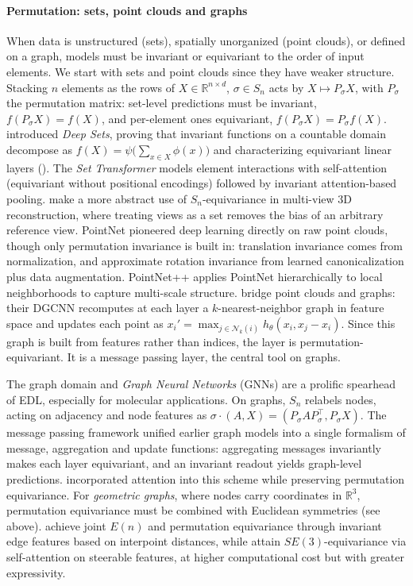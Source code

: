 \documentclass[mathematics,review,submit,moreauthors]{Definitions/mdpi}
\begin{document}
\paragraph{Permutation: sets, point clouds and graphs}\label{sec:edl-permutation}
When data is unstructured (sets), spatially unorganized (point clouds), or defined on a graph, models must be invariant or equivariant to the order of input elements.
We start with sets and point clouds since they have weaker structure.
Stacking $n$ elements as the rows of $X\in\mathbb{R}^{n\times d}$, $\sigma\in S_n$ acts by $X\mapsto P_\sigma X$, with $P_\sigma$ the permutation matrix: set-level predictions must be invariant, $f(P_\sigma X)=f(X)$, and per-element ones equivariant, $f(P_\sigma X)=P_\sigma f(X)$.
\citet{zaheer2018} introduced \emph{Deep Sets}, proving that invariant functions on a countable domain decompose as $f(X)=\psi\big(\sum_{x\in X}\phi(x)\big)$ and characterizing equivariant linear layers ().
The \emph{Set Transformer} \citep{lee2019p3icml} models element interactions with self-attention (equivariant without positional encodings) followed by invariant attention-based pooling.
\citet{wang2025} make a more abstract use of $S_n$-equivariance in multi-view 3D reconstruction, where treating views as a set removes the bias of an arbitrary reference view.
PointNet \citep{qi2017a} pioneered deep learning directly on raw point clouds, though only permutation invariance is built in: translation invariance comes from normalization, and approximate rotation invariance from learned canonicalization plus data augmentation. 
PointNet++ \citep{qi2017} applies PointNet hierarchically to local neighborhoods to capture multi-scale structure.
\citet{wang2019} bridge point clouds and graphs: their DGCNN recomputes at each layer a $k$-nearest-neighbor graph in feature space and updates each point as $x_i'=\max_{j\in\mathcal{N}_k(i)}h_\theta(x_i,x_j-x_i)$.
Since this graph is built from features rather than indices, the layer is permutation-equivariant.
It is a message passing layer, the central tool on graphs.

The graph domain and \emph{Graph Neural Networks} (GNNs) are a prolific spearhead of EDL, especially for molecular applications.
On graphs, $S_n$ relabels nodes, acting on adjacency and node features as $\sigma\cdot(A,X)=(P_\sigma AP_\sigma^\top,P_\sigma X)$.
The message passing framework \citep{gilmer2017} unified earlier graph models \citep{duvenaud2015,kipf2017,bruna2014} into a single formalism of message, aggregation and update functions: aggregating messages invariantly makes each layer equivariant, and an invariant readout yields graph-level predictions.
\citet{velickovic2018} incorporated attention into this scheme while preserving permutation equivariance.
For \emph{geometric graphs}, where nodes carry coordinates in $\mathbb{R}^3$, permutation equivariance must be combined with Euclidean symmetries (see above).
\citet{satorras2021p3icml} achieve joint $E(n)$ and permutation equivariance through invariant edge features based on interpoint distances, while \citet{fuchs2020} attain $SE(3)$-equivariance via self-attention on steerable features, at higher computational cost but with greater expressivity.
\end{document}
